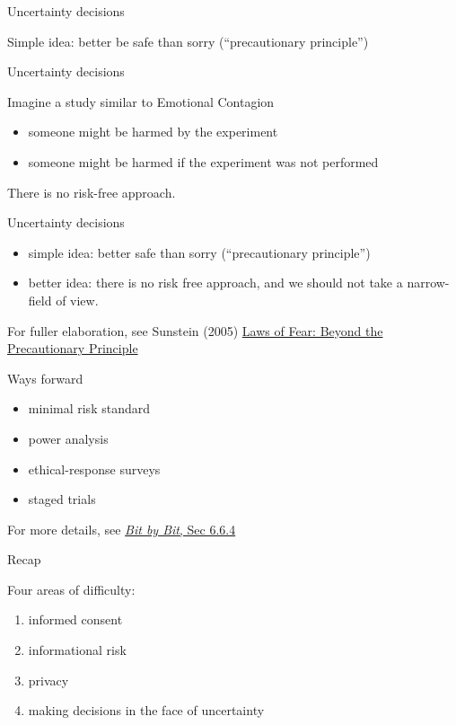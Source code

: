 \documentclass{beamer}
\def\vf{\vfill}
\begin{document}
\begin{frame}{Uncertainty decisions}

Simple idea: better be safe than sorry (``precautionary principle'')

\end{frame}
\begin{frame}{Uncertainty decisions}

Imagine a study similar to Emotional Contagion\\
\begin{itemize}
\item someone might be harmed by the experiment
\item someone might be harmed if the experiment was not performed
\end{itemize}

\vf
There is no risk-free approach.

\end{frame}
\begin{frame}{Uncertainty decisions}

\begin{itemize}
\item simple idea: better safe than sorry (``precautionary principle'')
\pause
\item better idea: there is no risk free approach, and we should not take a narrow-field of view.
\end{itemize}

\vf
For fuller elaboration, see Sunstein (2005) \href{https://www.amazon.com/Laws-Fear-Precautionary-Principle-Lectures/dp/0521615127}{Laws of Fear: Beyond the Precautionary Principle}
\end{frame}
\begin{frame}{Ways forward}

\begin{itemize}
\item minimal risk standard
\item power analysis
\item ethical-response surveys
\item staged trials
\end{itemize}

For more details, see \href{https://www.bitbybitbook.com/en/1st-ed/ethics/dilemmas/uncertainty/}{\textit{Bit by Bit}, Sec 6.6.4}
\end{frame}
\begin{frame}{Recap}

Four areas of difficulty:
\begin{enumerate}
\item informed consent
\item informational risk
\item privacy
\item making decisions in the face of uncertainty
\end{enumerate}

\end{frame}
\end{document}
